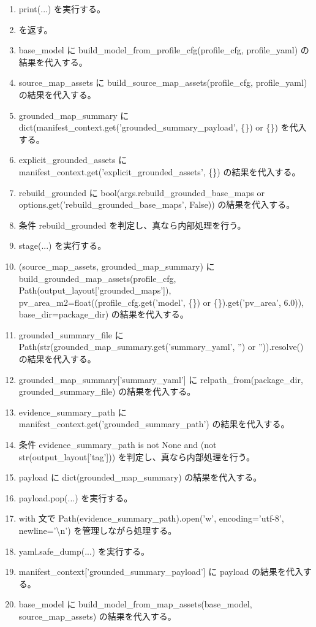 \documentclass[a4paper,11pt]{article}
\begin{document}
\begin{enumerate}[leftmargin=1.8em]
\item   print(...) を実行する。
\item    を返す。
\item base\_model に build\_model\_from\_profile\_cfg(profile\_cfg, profile\_yaml) の結果を代入する。
\item source\_map\_assets に build\_source\_map\_assets(profile\_cfg, profile\_yaml) の結果を代入する。
\item grounded\_map\_summary に dict(manifest\_context.get('grounded\_summary\_payload', \{\}) or \{\}) を代入する。
\item explicit\_grounded\_assets に manifest\_context.get('explicit\_grounded\_assets', \{\}) の結果を代入する。
\item rebuild\_grounded に bool(args.rebuild\_grounded\_base\_maps or options.get('rebuild\_grounded\_base\_maps', False)) の結果を代入する。
\item 条件 rebuild\_grounded を判定し、真なら内部処理を行う。
\item   stage(...) を実行する。
\item   (source\_map\_assets, grounded\_map\_summary) に build\_grounded\_map\_assets(profile\_cfg, Path(output\_layout['grounded\_maps']), pv\_area\_m2=float((profile\_cfg.get('model', \{\}) or \{\}).get('pv\_area', 6.0)), base\_dir=package\_dir) の結果を代入する。
\item   grounded\_summary\_file に Path(str(grounded\_map\_summary.get('summary\_yaml', '') or '')).resolve() の結果を代入する。
\item   grounded\_map\_summary['summary\_yaml'] に relpath\_from(package\_dir, grounded\_summary\_file) の結果を代入する。
\item   evidence\_summary\_path に manifest\_context.get('grounded\_summary\_path') の結果を代入する。
\item   条件 evidence\_summary\_path is not None and (not str(output\_layout['tag'])) を判定し、真なら内部処理を行う。
\item     payload に dict(grounded\_map\_summary) の結果を代入する。
\item     payload.pop(...) を実行する。
\item     with 文で Path(evidence\_summary\_path).open('w', encoding='utf-8', newline='\textbackslash{}n') を管理しながら処理する。
\item       yaml.safe\_dump(...) を実行する。
\item     manifest\_context['grounded\_summary\_payload'] に payload の結果を代入する。
\item   base\_model に build\_model\_from\_map\_assets(base\_model, source\_map\_assets) の結果を代入する。

\end{enumerate}
\end{document}
